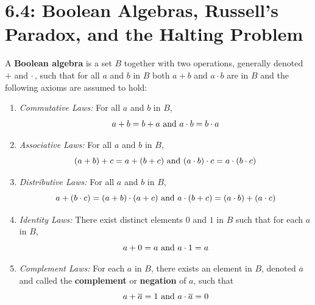 \documentclass[../mathNotesPreamble]{subfiles}
\providecommand{\relscalefact}{1.4}
\begin{document}
\relscale{\relscalefact}
  \section{6.4: Boolean Algebras, Russell's Paradox, and the Halting Problem}

  \begin{defn*}
    A \textbf{Boolean algebra} is a set $B$ together with two operations, generally denoted $+$ and $\cdot$\,, such that for all $a$ and $b$ in $B$ both $a+b$ and $a\cdot b$ are in $B$ and the following axioms are assumed to hold:
    \begin{enumerate}
      \item \textit{Commutative Laws:} For all $a$ and $b$ in $B$,
        \[a+b=b+a \textnormal{ and } a\cdot b=b\cdot a\]
      \item \textit{Associative Laws:} For all $a$ and $b$ in $B$,
        \[(a+b)+c=a+(b+c) \textnormal{ and } (a\cdot b)\cdot c=a\cdot(b\cdot c)\]
      \item \textit{Distributive Laws:} For all $a$ and $b$ in $B$,
        \[a+(b\cdot c)=(a+b)\cdot(a+c) \textnormal{ and } a\cdot(b+c)=(a\cdot b)+(a\cdot c)\]
      \item \textit{Identity Laws:} There exist distinct elements $0$ and $1$ in $B$ such that for each $a$ in $B$,
        \[a+0=a \textnormal{ and } a\cdot 1=a\]
      \item \textit{Complement Laws:} For each $a$ in $B$, there exists an element in $B$, denoted $\overline{a}$ and called the \textbf{complement} or \textbf{negation} of $a$, such that
        \[a+\overline{a}=1 \textnormal{ and } a\cdot\overline{a}=0\]
    \end{enumerate}
  \end{defn*}
  \pagebreak
\end{document}

